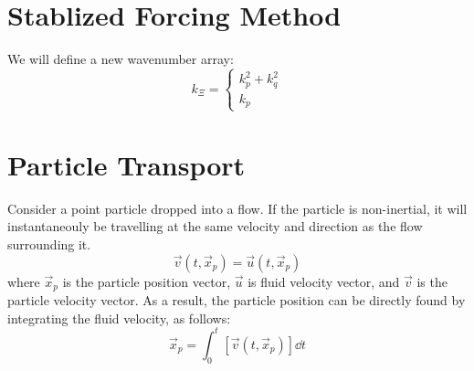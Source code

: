 \documentclass[10pt, reqno]{amsart}
\begin{document}
\begin{multicols}{2}
\section*{Stablized Forcing Method}
We will define a new wavenumber array: 
\begin{equation}
    k_\Xi = \begin{cases}
        k_p^2 + k_q^2 \\
        k_p
    \end{cases}
\end{equation}

\section*{Particle Transport}
Consider a point particle dropped into a flow. If the particle is non-inertial, it will instantaneouly be travelling at the same velocity and direction as the flow surrounding it.
\begin{equation}
    \vec{v}(t, \vec{x}_p) = \vec{u}(t, \vec{x}_p)
\end{equation}
where $\vec{x}_p$ is the particle position vector, $\vec{u}$ is fluid velocity vector, and $\vec{v}$ is the particle velocity vector. As a result, the particle position can be directly found by integrating the fluid velocity, as follows:
\begin{equation}
    \vec{x}_p = \int_0^t \left[ \vec{v}(t, \vec{x}_p) \right] \dd t
\end{equation}


\end{multicols}
\end{document}
